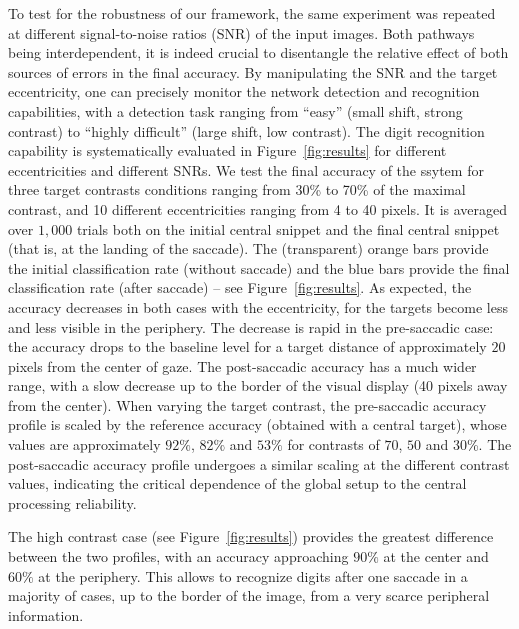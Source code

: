 To test for the robustness of our framework, the same experiment was repeated at different signal-to-noise ratios (SNR) of the input images. Both pathways being interdependent, it is indeed crucial to disentangle the relative effect of both sources of errors in the final accuracy. By manipulating the SNR and the target eccentricity, one can precisely monitor the network detection and recognition capabilities, with a detection task ranging from ``easy'' (small shift, strong contrast) to ``highly difficult'' (large shift, low contrast). The digit recognition capability is systematically evaluated in Figure~\ref{fig:results} for different eccentricities and different SNRs. We test the final accuracy of the ssytem for three target contrasts conditions ranging from 30\% to 70\% of the maximal contrast, and 10 different eccentricities ranging from 4 to 40 pixels. It is averaged over $1,000$ trials both on the initial central snippet and the final central snippet (that is, at the landing of the saccade). The (transparent) orange bars provide the initial classification rate (without saccade) and the blue bars provide the final classification rate (after saccade) -- see Figure~\ref{fig:results}. As expected, the accuracy decreases in both cases with the eccentricity, for the targets become less and less visible in the periphery. The decrease is rapid in the pre-saccadic case: the accuracy drops to the baseline level for a target distance of approximately $20$ pixels from the center of gaze. The post-saccadic accuracy has a much wider range, with a slow decrease up to the border of the visual display (40 pixels away from the center).
When varying the target contrast, the pre-saccadic accuracy profile is scaled by the reference accuracy (obtained with a central target), whose values are approximately $92\%$, $82\%$ and $53\%$ for contrasts of $70$, $50$ and $30$\%. The post-saccadic accuracy profile undergoes a similar scaling at the different contrast values, indicating the critical dependence of the global setup to the central processing reliability.

The high contrast case (see Figure~\ref{fig:results}) provides the greatest difference between the two profiles, with an accuracy approaching $90\%$ at the center and $60\%$ at the periphery. This allows to recognize digits after one saccade in a majority of cases, up to the border of the image, from a very scarce peripheral information.


